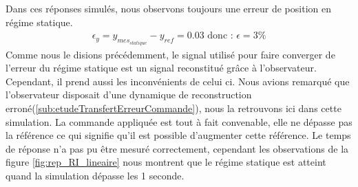 		Dans ces réponses simulés, nous observons toujours une erreur de position en régime statique.
\begin{align*}\label{eqn:erreurML_RI}
\epsilon_y = y_{mes_{statique}} - y_{ref} = 0.03 \text{ donc : }\epsilon = 3\%
\end{align*}
Comme nous le disions précédemment, le signal utilisé pour faire converger de l'erreur du régime statique est un signal reconstitué grâce à l'observateur. Cependant, il prend aussi les inconvénients de celui ci. Nous avions remarqué que l'observateur disposait d'une dynamique de reconstruction erroné(\ref{sub:etudeTransfertErreurCommande}), nous la retrouvons ici dans cette simulation.
		La commande appliquée est tout à fait convenable, elle ne dépasse pas la référence ce qui signifie qu'il est possible d'augmenter cette référence. Le temps de réponse n'a pas pu être mesuré correctement, cependant les observations de la figure \ref{fig:rep_RI_lineaire} nous montrent que le régime statique est atteint quand la simulation dépasse les 1 seconde.
